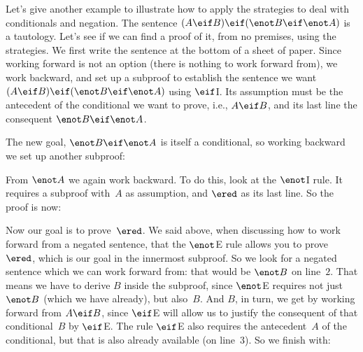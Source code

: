 Let's give another example to illustrate how to apply the strategies to deal with conditionals and negation. The sentence $(A \eif B) \eif (\enot B \eif \enot A)$ is a tautology. Let's see if we can find a proof of it, from no premises, using the strategies. We first write the sentence at the bottom of a sheet of paper. Since working forward is not an option (there is nothing to work forward from), we work backward, and set up a subproof to establish the sentence we want $(A \eif B) \eif (\enot B \eif \enot A)$ using $\eif$I. Its assumption must be the antecedent of the conditional we want to prove, i.e., $A \eif B$, and its last line the consequent $\enot B \eif \enot A$.
\begin{fitchproof}
\open
{}
\ellipsesline
{}
\close
{}
\end{fitchproof}
The new goal, $\enot B \eif \enot A$ is itself a conditional, so working backward we set up another subproof:
\begin{fitchproof}
	\open
	\open
	\ellipsesline
	\close
	\close
\end{fitchproof}
From $\enot A$ we again work backward. To do this, look at the $\enot$I rule. It requires a subproof with~$A$ as assumption, and $\ered$ as its last line. So the proof is now:
\begin{fitchproof}
	\open
	\open
	\open{}
	\ellipsesline
	\close
	\close
	\close
\end{fitchproof}
Now our goal is to prove~$\ered$. We said above, when discussing how to work forward from a negated sentence, that the $\enot$E rule allows you to prove~$\ered$, which is our goal in the innermost subproof. So we look for a negated sentence which we can work forward from: that would be $\enot B$ on line~$2$. That means we have to derive $B$ inside the subproof, since $\enot$E requires not just $\enot B$ (which we have already), but also~$B$. And $B$, in turn, we get by working forward from $A \eif B$, since $\eif$E will allow us to justify the consequent of that conditional~$B$ by $\eif$E. The rule $\eif$E also requires the antecedent~$A$ of the conditional, but that is also already available (on line~$3$). So we finish with:
\begin{fitchproof}
	\open
	\open
	\open{}
	\close
	\close
	\close
\end{fitchproof}

